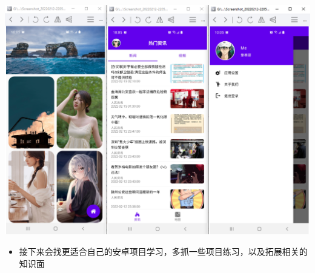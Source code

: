 \documentclass[9pt, b5paper]{article}
\begin{document}
\includegraphics[width=.9\linewidth]{./pic/screens2.png}

\begin{itemize}
\item 接下来会找更适合自己的安卓项目学习，多抓一些项目练习，以及拓展相关的知识面
\end{itemize}
\end{document}
